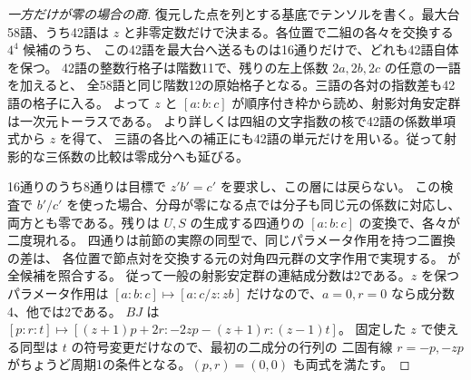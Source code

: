 \begin{proof}[一方だけが零の場合の商]
復元した点を列とする基底でテンソルを書く。最大台58語、うち42語は
$z$ と非零定数だけで決まる。各位置で二組の各々を交換する $4^4$ 候補のうち、
この42語を最大台へ送るものは16通りだけで、どれも42語自体を保つ。
42語の整数行格子は階数11で、残りの左上係数 $2a,2b,2c$ の任意の一語を加えると、
全58語と同じ階数12の原始格子となる。三語の各対の指数差も42語の格子に入る。
よって $z$ と $[a:b:c]$ が順序付き枠から読め、射影対角安定群は一次元トーラスである。
より詳しくは四組の文字指数の核で42語の係数単項式から $z$ を得て、
三語の各比への補正にも42語の単元だけを用いる。従って射影的な三係数の比較は零成分へも延びる。

16通りのうち8通りは目標で $z'b'=c'$ を要求し、この層には戻らない。
この検査で $b'/c'$ を使った場合、分母が零になる点では分子も同じ元の係数に対応し、
両方とも零である。残りは $U,S$ の生成する四通りの $[a:b:c]$ の変換で、各々が二度現れる。
四通りは前節の実際の同型で、同じパラメータ作用を持つ二置換の差は、
各位置で節点対を交換する元の対角四元群の文字作用で実現する。
 が全候補を照合する。
従って一般の射影安定群の連結成分数は2である。$z$ を保つパラメータ作用は
$[a:b:c]\mapsto[a:c/z:zb]$ だけなので、$a=0,r=0$ なら成分数4、他では2である。
$BJ$ は $[p:r:t]\mapsto[(z+1)p+2r:-2zp-(z+1)r:(z-1)t]$。
固定した $z$ で使える同型は $t$ の符号変更だけなので、最初の二成分の行列の
二固有線 $r=-p,-zp$ がちょうど周期1の条件となる。$(p,r)=(0,0)$ も両式を満たす。
\end{proof}

